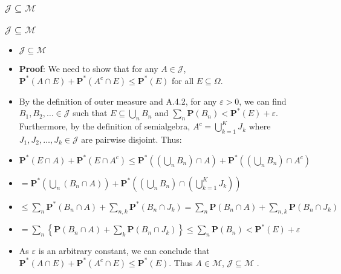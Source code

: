 \documentclass[handout]{beamer}
\newcommand{\BP}{\mathbf{P}}
\begin{document}
\subsubsection{$\mathcal{J} \subseteq \mathcal{M}$}
\frame
{
  \frametitle{$\mathcal{J} \subseteq \mathcal{M}$}

\begin{itemize}

\item<1->   [] \begin{Lemma} $\mathcal{J}\subseteq \mathcal{M}$ \end{Lemma}    
       
\item<2-> []\textbf{Proof}: We need to show that for any $A\in \mathcal{J}$, $\BP^*(A\cap E)+\BP^*(A^c\cap E)\leq \BP^*(E)$ for all $E \subseteq \Omega$. 
              
\item<3->  By the definition of outer measure and A.4.2, for any $\varepsilon>0$, we can find $B_1, B_2, \ldots \in\mathcal{J}$ such that $E\subseteq \bigcup_n B_n$ and $\sum_n \BP(B_n) < \BP^*(E)+\varepsilon$. Furthermore, by the definition of semialgebra, $A^c=\bigcup_{k=1}^K J_k$ where $J_1,J_2,\ldots, J_k\in \mathcal{J} $ are pairwise disjoint. Thus: 

\item<4->$ \BP^*(E\cap A)+\BP^*(E\cap A^c ) \leq \BP^*((\bigcup_n B_n)\cap A)+\BP^*((\bigcup_n B_n) \cap A^c) $

\item<5->[] $=\BP^*( \bigcup_n (B_n \cap A) )+\BP^*((\bigcup_n B_n)\cap ( \bigcup_{k=1}^K J_k) )$ 

\item<6->[]  $\leq \sum_n \BP^*( B_n \cap A)+\sum_{n,k}\BP^*(B_n \cap  J_k)=\sum_n \BP( B_n \cap A)+\sum_{n,k}\BP(B_n \cap  J_k) $

\item<7->[]  $= \sum_n \left\{ \BP( B_n \cap A)+\sum_{k}\BP(B_n \cap  J_k) \right\}\leq \sum_n \BP( B_n)  < \BP^*(E)+\varepsilon $

\item<8-> As $\varepsilon$ is an arbitrary constant, we  can conclude that $\BP^*(A\cap E)+\BP^*(A^c\cap E)\leq \BP^*(E)$. Thus $A\in \mathcal{M}$, $\mathcal{J}\subseteq \mathcal{M}$ .
                                      

                   \end{itemize}
}
\end{document}
